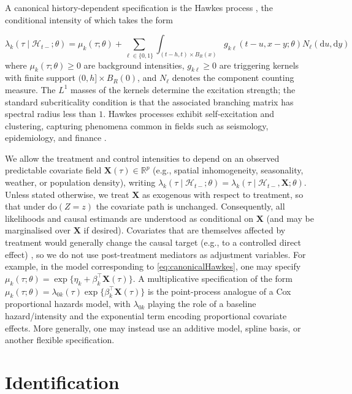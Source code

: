 \documentclass{statsoc}
\newcommand{\dd}{\mathrm{d}}
\newcommand{\1}{\mathbbm{1}}
\newcommand{\CovX}{\mathbf{X}}
\newcommand{\Fobs}{\mathcal H}
\newcommand{\Nproc}{N}
\begin{document}
A canonical history-dependent specification is the Hawkes process \citep{Hawkes1,hawkes1974cluster}, the conditional intensity of which takes the form

\begin{equation}\label{eq:canonicalHawkes}
\lambda_k(\tau\mid\Fobs_{t-};\theta)
= \mu_k(\tau;\theta)+\sum_{\ell\in\{0,1\}}\int_{(t-h,t)\times B_R(x)}
g_{k\ell}(t-u,x-y;\theta) \Nproc_\ell(\dd u,\dd y)
\end{equation}
where \(\mu_k(\tau;\theta)\ge 0\) are background intensities, \(g_{k\ell}\ge 0\) are triggering kernels with finite support
\((0,h]\times B_R(0)\), and \(\Nproc_\ell\) denotes the component counting measure.  The \(L^1\) masses of the kernels determine the excitation strength; the standard subcriticality condition is that the associated branching matrix has spectral radius less than \(1\). Hawkes processes exhibit self-excitation and clustering, capturing phenomena common in fields such as seismology, epidemiology, and finance \citep{bacry2015hawkes,reinhart2018review}.

We allow the treatment and control intensities to depend on an observed predictable covariate field \(\CovX(\tau)\in\mathbb R^p\) (e.g., spatial inhomogeneity, seasonality, weather, or population density), writing
\(
\lambda_k(\tau\mid\Fobs_{t-};\theta)
=
\lambda_k(\tau\mid\Fobs_{t-},\CovX;\theta).
\)
Unless stated otherwise, we treat \(\CovX\) as exogenous with respect to treatment, so that under \(\mathrm{do}(Z=z)\) the covariate path is unchanged. Consequently, all likelihoods and causal estimands are understood as conditional on \(\CovX\) (and may be marginalised over \(\CovX\) if desired). Covariates that are themselves affected by treatment would generally change the causal target (e.g., to a controlled direct effect) \citep{robins1992identifiability}, so we do not use post-treatment mediators as adjustment variables. For example, in the model corresponding to \cref{eq:canonicalHawkes}, one may specify
\(
\mu_k(\tau;\theta)=\exp\{\eta_k+\beta_k^\top \CovX(\tau)\}. 
\)
A multiplicative specification of the form \(\mu_k(\tau;\theta)=\lambda_{0k}(\tau)\exp\{\beta_k^\top \CovX(\tau)\}\) is the point-process analogue of a Cox proportional hazards model, with \(\lambda_{0k}\) playing the role of a baseline hazard/intensity and the exponential term encoding proportional covariate effects. More generally, one may instead use an additive model, spline basis, or another flexible specification.
\section{Identification}\label{sec:identification}
\end{document}
